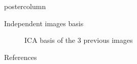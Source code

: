 \documentclass{beamer}
\begin{document}
\begin{frame}
\begin{columns}
\begin{column}{.5\textwidth}
\begin{beamercolorbox}[center]{postercolumn}
\begin{minipage}{.98\textwidth}
{\begin{myblock}{Independent images basis}
\begin{figure}[H]
							\caption{ICA basis of the $3$ previous images}
						\end{figure}
					\end{myblock}\vfill
					\begin{myblock}{References}
						\footnotesize
						
						
					\end{myblock}\vfill
		}\end{minipage}\end{beamercolorbox}
	\end{column}
\end{columns}
\end{frame}
\end{document}

